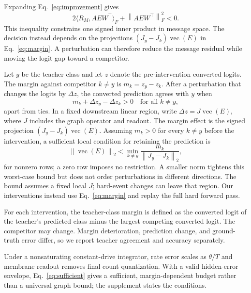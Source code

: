 \documentclass[10pt,twocolumn,letterpaper]{article}
\newcommand{\norm}[1]{\left\lVert#1\right\rVert}
\begin{document}
Expanding Eq.~\eqref{eq:improvement} gives
\begin{equation}
2\langle R_M,AEW^\top\rangle_F+\norm{AEW^\top}_F^2<0.
\end{equation}
This inequality constrains one signed inner product in message space. The decision instead depends on the projections $(J_y-J_k)\operatorname{vec}(E)$ in Eq.~\eqref{eq:margin}. A perturbation can therefore reduce the message residual while moving the logit gap toward a competitor.

Let $y$ be the teacher class and let $z$ denote the pre-intervention converted logits. The margin against competitor $k\neq y$ is $m_k=z_y-z_k$. After a perturbation that changes the logits by $\Delta z$, the converted prediction agrees with $y$ when
\begin{equation}
 m_k+\Delta z_y-\Delta z_k>0\quad\text{for all }k\neq y,
 \label{eq:margin}
\end{equation}
apart from ties. In a fixed downstream linear region, write $\Delta z=J\operatorname{vec}(E)$, where $J$ includes the graph operator and readout. The margin effect is the signed projection $(J_y-J_k)\operatorname{vec}(E)$. Assuming $m_k>0$ for every $k\neq y$ before the intervention, a sufficient local condition for retaining the prediction is
\begin{equation}
 \norm{\operatorname{vec}(E)}_2<
 \min_{k\neq y}\frac{m_k}{\norm{J_y-J_k}_2},\label{eq:sufficient}
\end{equation}
for nonzero rows; a zero row imposes no restriction. A smaller norm tightens this worst-case bound but does not order perturbations in different directions. The bound assumes a fixed local $J$; hard-event changes can leave that region. Our interventions instead use Eq.~\eqref{eq:margin} and replay the full hard forward pass.

For each intervention, the teacher-class margin is defined as the converted logit of the teacher's predicted class minus the largest competing converted logit. The competitor may change. Margin deterioration, prediction change, and ground-truth error differ, so we report teacher agreement and accuracy separately.

Under a nonsaturating constant-drive integrator, rate error scales as $\theta/T$ and membrane readout removes final count quantization. With a valid hidden-error envelope, Eq.~\eqref{eq:sufficient} gives a sufficient, margin-dependent budget rather than a universal graph bound; the supplement states the conditions.
\end{document}
